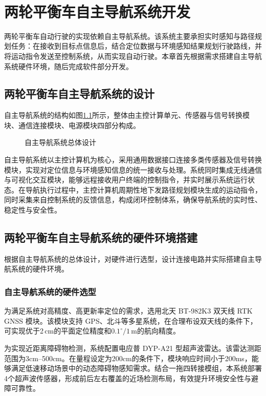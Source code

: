 ﻿\chapter{两轮平衡车自主导航系统开发}
两轮平衡车自动行驶的实现依赖自主导航系统。该系统主要承担实时感知与路径规划任务：在接收到目标点信息后，结合定位数据与环境感知结果规划行驶路线，并将运动指令发送至控制系统，从而实现自动行驶。本章首先根据需求搭建自主导航系统硬件环境，随后完成软件部分开发。

\section{两轮平衡车自主导航系统的设计}

自主导航系统的结构如图\ref{自主导航系统总体设计}所示，整体由主控计算单元、传感器与信号转换模块、通信连接模块、电源模块四部分构成。

\begin{figure}[h]
\centering

\caption{自主导航系统总体设计}
\label{自主导航系统总体设计}
\end{figure}

自主导航系统以主控计算机为核心，采用通用数据接口连接多类传感器及信号转换模块，实现对定位信息与环境感知信息的统一接收与处理。系统同时集成无线通信与可视化交互模块，能够远程接收用户终端的控制指令，并实时展示系统运行状态。在导航执行过程中，主控计算机周期性地下发路径规划模块生成的运动指令，同时采集来自控制系统的反馈信息，构成闭环控制体系，确保导航系统的实时性、稳定性与安全性。

\section{两轮平衡车自主导航系统的硬件环境搭建}

根据自主导航系统的总体设计，对硬件进行选型，设计连接电路并实际搭建自主导航系统的硬件环境。

\subsection{自主导航系统的硬件选型}

为满足系统对高精度、高更新率定位的需求，选用北天 BT-982K3 双天线 RTK GNSS 模块。该模块支持 GPS、北斗等多星系统，在合理布设双天线的条件下，可实现优于2\,cm的平面定位精度和$0.1^\circ/1\,\mathrm{m}$的航向精度。

为实现近距离障碍物检测，系统配置电应普 DYP-A21 型超声波雷达。该雷达测距范围为3cm--500cm。在量程设定为200cm的条件下，模块响应时间小于200ms，能够满足低速移动场景中的动态障碍物感知需求。结合一拖四转接模组，本系统部署4个超声波传感器，形成前后左右覆盖的近场检测布局，有效提升环境安全性与避障可靠性。

